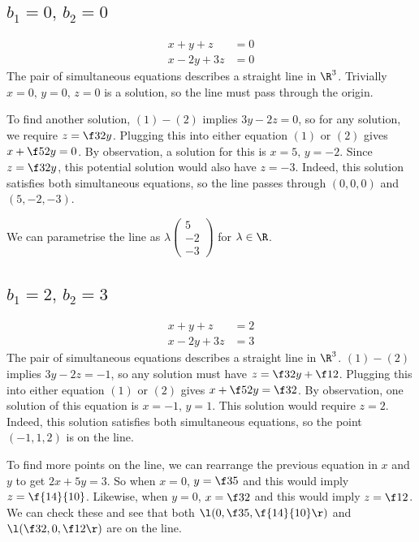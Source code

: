 \documentclass[a4paper]{article}
\begin{document}
\subsection{$b_1 = 0,\, b_2 = 0$} %

\begin{align*}
x + y + z &= 0 \tag{1}\\
x - 2y + 3z &= 0 \tag{2}
\end{align*}
The pair of simultaneous equations describes a straight line in $\R^3$. Trivially $x=0,\, y=0,\, z=0$ is a solution, so the line must pass through the origin.

To find another solution, $(1)-(2)$ implies $3y-2z=0$, so for any solution, we require $z = \f32 y$. Plugging this into either equation $(1)$ or $(2)$ gives $x + \f52 y = 0$. By observation, a solution for this is $x=5,\, y=-2$. Since $z=\f32 y$, this potential solution would also have $z=-3$. Indeed, this solution satisfies both simultaneous equations, so the line passes through $(0, 0, 0)$ and $(5, -2, -3)$.

We can parametrise the line as $\lambda \begin{pmatrix}5\\ -2\\ -3\end{pmatrix}$ for $\lambda \in \R$.

\subsection{$b_1 = 2,\, b_2 = 3$} %

\begin{align*}
x + y + z &= 2 \tag{1}\\
x - 2y + 3z &= 3 \tag{2}
\end{align*}
The pair of simultaneous equations describes a straight line in $\R^3$. $(1)-(2)$ implies $3y-2z=-1$, so any solution must have $z = \f32 y + \f12$. Plugging this into either equation $(1)$ or $(2)$ gives $x + \f52 y = \f32$. By observation, one solution of this equation is $x=-1,\, y=1$. This solution would require $z=2$. Indeed, this solution satisfies both simultaneous equations, so the point $(-1, 1, 2)$ is on the line.

To find more points on the line, we can rearrange the previous equation in $x$ and $y$ to get $2x+5y=3$. So when $x=0$, $y=\f35$ and this would imply $z=\f{14}{10}$. Likewise, when $y=0$, $x=\f32$ and this would imply $z=\f12$. We can check these and see that both $\l( 0, \f35, \f{14}{10} \r)$ and $\l( \f32, 0, \f12 \r)$ are on the line.
\end{document}
